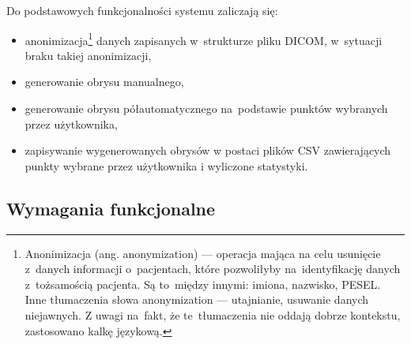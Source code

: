 \documentclass[a4paper,11pt,twoside,openright]{report}
\theoremstyle{definition}
\begin{document}
Do podstawowych funkcjonalności systemu zaliczają się:
\begin{itemize}[noitemsep]
\item anonimizacja\footnote {Anonimizacja (ang. anonymization) --- operacja mająca
na celu usunięcie z~danych informacji o~pacjentach, które pozwoliłyby na~identyfikację
danych z~tożsamością pacjenta. Są to~między innymi: imiona, nazwisko, PESEL.
Inne tłumaczenia słowa anonymization --- utajnianie, usuwanie danych niejawnych.
Z uwagi na~fakt, że te~tłumaczenia nie oddają dobrze kontekstu, zastosowano kalkę
językową.} danych zapisanych w~strukturze pliku DICOM, w~sytuacji braku takiej anonimizacji,
\item generowanie obrysu manualnego,
\item generowanie obrysu półautomatycznego na~podstawie punktów wybranych przez użytkownika,
\item zapisywanie wygenerowanych obrysów w postaci plików CSV zawierających
punkty wybrane przez użytkownika i wyliczone statystyki.
\end{itemize}

\subsection {Wymagania funkcjonalne}
\end{document}
